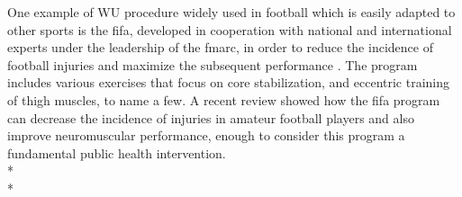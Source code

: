 One example of WU procedure widely used in football which is easily adapted to other sports is the \acrfull{fifa}, developed in cooperation with national and international experts under the leadership of the \acrfull{fmarc}, in order to reduce the incidence of football injuries and maximize the subsequent performance \cite{fifa}. The program includes various exercises that focus on core stabilization, and eccentric training of thigh muscles, to name a few. A recent review  \cite{barengo2014impact} showed how the \acrshort{fifa} program can decrease the incidence of injuries in amateur football players and also improve neuromuscular performance, enough to consider this program a fundamental public health intervention.\\*\\*
